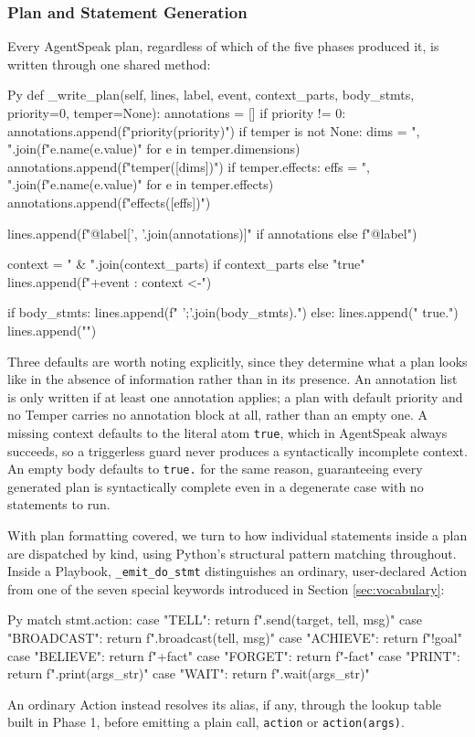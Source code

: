 \subsubsection{Plan and Statement Generation}
Every AgentSpeak plan, regardless of which of the five phases produced it, is written through one shared method:
\begin{codeblock}[]{Py}
def _write_plan(self, lines, label, event, context_parts, body_stmts,
                 priority=0, temper=None):
    annotations = []
    if priority != 0:
        annotations.append(f"priority({priority})")
    if temper is not None:
        dims = ", ".join(f"{e.name}({e.value})" for e in temper.dimensions)
        annotations.append(f"temper([{dims}])")
        if temper.effects:
            effs = ", ".join(f"{e.name}({e.value})" for e in temper.effects)
            annotations.append(f"effects([{effs}])")

    lines.append(f"@{label}[{', '.join(annotations)}]" if annotations else f"@{label}")

    context = " & ".join(context_parts) if context_parts else "true"
    lines.append(f"+{event} : {context} <-")

    if body_stmts:
        lines.append(f"    {';\n    '.join(body_stmts)}.")
    else:
        lines.append("    true.")
    lines.append("")
\end{codeblock}
Three defaults are worth noting explicitly, since they determine what a plan looks like in the absence of information rather than in its presence. An annotation list is only written if at least one annotation applies; a plan with default priority and no Temper carries no annotation block at all, rather than an empty one. A missing context defaults to the literal atom \lstinline|true|, which in AgentSpeak always succeeds, so a triggerless guard never produces a syntactically incomplete context. An empty body defaults to \lstinline|true.| for the same reason, guaranteeing every generated plan is syntactically complete even in a degenerate case with no statements to run.

With plan formatting covered, we turn to how individual statements inside a plan are dispatched by kind, using Python's structural pattern matching throughout. Inside a Playbook, \lstinline|_emit_do_stmt| distinguishes an ordinary, user-declared Action from one of the seven special keywords introduced in Section \ref{sec:vocabulary}:
\begin{codeblock}[]{Py}
match stmt.action:
    case "TELL":      return f".send({target}, tell, {msg})"
    case "BROADCAST": return f".broadcast(tell, {msg})"
    case "ACHIEVE":   return f"!{goal}"
    case "BELIEVE":   return f"+{fact}"
    case "FORGET":    return f"-{fact}"
    case "PRINT":     return f".print({args_str})"
    case "WAIT":      return f".wait({args_str})"
\end{codeblock}
An ordinary Action instead resolves its alias, if any, through the lookup table built in Phase 1, before emitting a plain call, \lstinline|action| or \lstinline|action(args)|.

